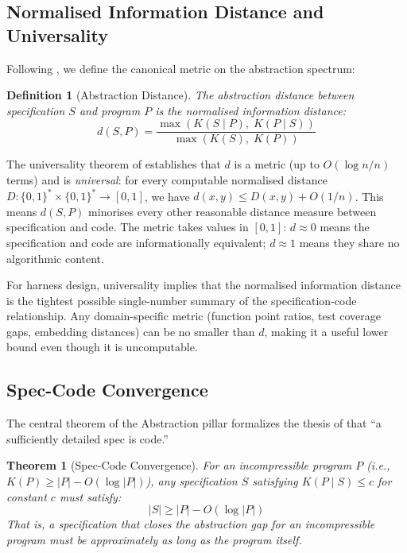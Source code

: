 \documentclass[11pt, a4paper, logo, copyright]{googledeepmind}
\newtheorem{definition}{Definition}[section]
\newtheorem{theorem}{Theorem}[section]
\begin{document}
\subsection{Normalised Information Distance and Universality}

Following \citet{li2004similarity}, we define the canonical metric on the abstraction spectrum:

\begin{definition}[Abstraction Distance]
The \emph{abstraction distance} between specification $S$ and program $P$ is the normalised information distance:
\begin{equation}
    d(S, P) = \frac{\max(K(S \mid P),\; K(P \mid S))}{\max(K(S),\; K(P))}
\end{equation}
\end{definition}

The universality theorem of \citet{li2004similarity} establishes that $d$ is a metric (up to $O(\log n / n)$ terms) and is \emph{universal}: for every computable normalised distance $D: \{0,1\}^* \times \{0,1\}^* \to [0,1]$, we have $d(x, y) \leq D(x, y) + O(1/n)$. This means $d(S, P)$ minorises every other reasonable distance measure between specification and code. The metric takes values in $[0, 1]$: $d \approx 0$ means the specification and code are informationally equivalent; $d \approx 1$ means they share no algorithmic content.

For harness design, universality implies that the normalised information distance is the tightest possible single-number summary of the specification-code relationship. Any domain-specific metric (function point ratios, test coverage gaps, embedding distances) can be no smaller than $d$, making it a useful lower bound even though it is uncomputable.

\subsection{Spec-Code Convergence}

The central theorem of the Abstraction pillar formalizes the thesis of \citet{gonzalez2026spec} that ``a sufficiently detailed spec is code.''

\begin{theorem}[Spec-Code Convergence]
\label{thm:convergence}
For an incompressible program $P$ (i.e., $K(P) \geq |P| - O(\log |P|)$), any specification $S$ satisfying $K(P \mid S) \leq c$ for constant $c$ must satisfy:
\begin{equation}
    |S| \geq |P| - O(\log |P|)
\end{equation}
That is, a specification that closes the abstraction gap for an incompressible program must be approximately as long as the program itself.
\end{theorem}
\end{document}
